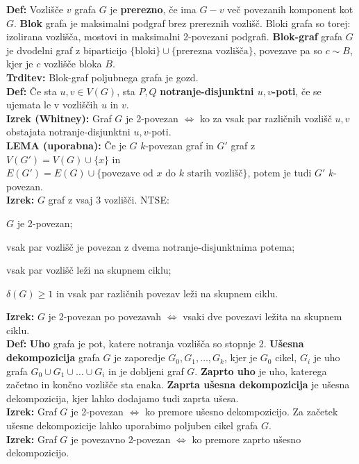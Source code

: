 \documentclass[a4paper,10pt]{article}
\theoremstyle{definition}
\newenvironment{enumerate*}%
{
\vspace{-10pt}
\begin{enumerate}
\setlength{\itemsep}{0pt}
\setlength{\parskip}{2pt}
}
{\end{enumerate}
\vspace{-10pt}}
\let\oldtextbf\textbf
\renewcommand{\textbf}[1]{\oldtextbf{\boldmath #1}}
\begin{document}
\textbf{Def:} Vozlišče $v$ grafa $G$ je \textbf{prerezno}, če ima $G - v$ več povezanih komponent kot $G$. \textbf{Blok} grafa je maksimalni podgraf brez prereznih vozlišč. Bloki grafa so torej: izolirana vozlišča, mostovi in maksimalni 2-povezani podgrafi. \textbf{Blok-graf} grafa $G$ je dvodelni graf z biparticijo $\{\text{bloki}\} \cup \{\text{prerezna vozlišča}\}$, povezave pa so $c \sim B$, kjer je $c$ vozlišče bloka $B$.\\
\textbf{Trditev:} Blok-graf poljubnega grafa je gozd.\\
\textbf{Def:} Če sta $u, v \in V(G)$, sta $P, Q$ \textbf{notranje-disjunktni $u, v$-poti}, če se ujemata le v vozliščih $u$ in $v$.\\
\textbf{Izrek (Whitney):} Graf $G$ je 2-povezan $\iff$ ko za vsak par različnih vozlišč $u, v$ obstajata notranje-disjunktni $u, v$-poti.\\
\textbf{LEMA (uporabna):} Če je $G$ $k$-povezan graf in $G'$ graf z $V(G') = V(G) \cup \{x\}$ in \\ $E(G') = E(G) \cup \{\text{povezave od $x$ do $k$ starih vozlišč}\}$, potem je tudi $G'$ $k$-povezan.\\
\textbf{Izrek:} $G$ graf z vsaj 3 vozlišči. NTSE:
\begin{enumerate*}
\item $G$ je 2-povezan;
\item vsak par vozlišč je povezan z dvema notranje-disjunktnima potema;
\item vsak par vozlišč leži na skupnem ciklu;
\item $\delta(G) \geq 1$ in vsak par različnih povezav leži na skupnem ciklu.
\end{enumerate*}
\textbf{Izrek:} $G$ je 2-povezan po povezavah $\iff$ vsaki dve povezavi ležita na skupnem ciklu.\\
\textbf{Def:} \textbf{Uho} grafa je pot, katere notranja vozlišča so stopnje 2. \textbf{Ušesna dekompozicija} grafa $G$ je zaporedje $G_0, G_1, \ldots, G_k$, kjer je $G_0$ cikel, $G_i$ je uho grafa $G_0 \cup G_1 \cup \ldots \cup G_i$ in je dobljeni graf $G$. \textbf{Zaprto uho} je uho, katerega začetno in končno vozlišče sta enaka. \textbf{Zaprta ušesna dekompozicija} je ušesna dekompozicija, kjer lahko dodajamo tudi zaprta ušesa.\\
\textbf{Izrek:} Graf $G$ je 2-povezan $\iff$ ko premore ušesno dekompozicijo. Za začetek ušesne dekompozicije lahko uporabimo poljuben cikel grafa $G$.\\
\textbf{Izrek:} Graf $G$ je povezavno 2-povezan $\iff$ ko premore zaprto ušesno dekompozicijo.
\end{document}
